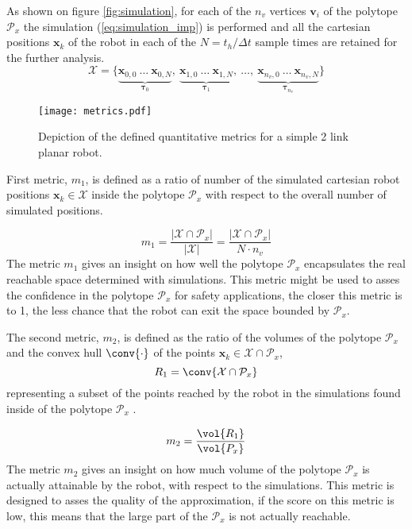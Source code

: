 As shown on figure  \ref{fig:simulation}, for each of the $n_v$ vertices $\bm{v}_i$ of the polytope $\mathcal{P}_x$ the simulation (\ref{eq:simulation_imp}) is performed and all the cartesian positions $\bm{x}_k$ of the robot in each of the $N=t_h/\Delta t$ sample times are retained for the further analysis. $$
\mathcal{X} = \{\underbrace{\bm{x}_{0,0}~\dots ~\bm{x}_{0,N}}_{\bm{\tau}_0},~\underbrace{\bm{x}_{1,0}~\dots~\bm{x}_{1,N}}_{\bm{\tau}_1},~\dots, ~ \underbrace{\bm{x}_{n_v,0}~\dots~\bm{x}_{n_v,N}}_{\bm{\tau}_{n_v}}\}
$$

\begin{figure}[!t]
    \centering
    \texttt{[image: metrics.pdf]}
    \caption{Depiction of the defined quantitative metrics for a simple 2 link planar robot. }
    \label{fig:metrics_defintition}
\vspace{-0.3cm}
\end{figure}


First metric, $m_1$, is defined as a ratio of number of the simulated cartesian robot positions $\bm{x}_k\in \mathcal{X}$ inside the polytope $\mathcal{P}_x$ with respect to the overall number of simulated positions. 

\begin{equation}
    m_1 = \frac{|\mathcal{X}\cap\mathcal{P}_x|}{|\mathcal{X}|} = \frac{|\mathcal{X}\cap\mathcal{P}_x|}{N\cdot n_v}
\end{equation}
The metric $m_1$ gives an insight on how well the polytope $\mathcal{P}_x$ encapsulates the real reachable space determined with simulations. This metric might be used to asses the confidence in the polytope $\mathcal{P}_x$ for safety applications, the closer this metric is to 1, the less chance that the robot can exit the space bounded by $\mathcal{P}_x$.

The second metric, $m_2$, is defined as the ratio of the volumes of the polytope $\mathcal{P}_x$ and the convex hull $\conv{\cdot}$ of the points $\bm{x}_k\in\mathcal{X}\cap\mathcal{P}_x$, $$ R_1 = \conv{\mathcal{X}\cap\mathcal{P}_x}$$ representing a subset of the points reached by the robot in the simulations found inside of the polytope $\mathcal{P}_x$ .

\begin{equation}
    m_2 = \frac{\vol{ R_1}}{\vol{P_x}}
\end{equation}
The metric $m_2$ gives an insight on how much volume of the polytope $\mathcal{P}_x$ is actually attainable by the robot, with respect to the simulations. This metric is designed to asses the quality of the approximation, if the score on this metric is low, this means that the large part of the $\mathcal{P}_x$ is not actually reachable.

